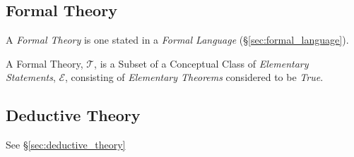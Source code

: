 \subsection{Formal Theory}\label{sec:formal_theory}

A \emph{Formal Theory} is one stated in a \emph{Formal Language}
(\S\ref{sec:formal_language}).

A Formal Theory, $\mathcal{T}$, is a Subset of a Conceptual Class of
\emph{Elementary Statements}, $\mathcal{E}$, consisting of
\emph{Elementary Theorems} considered to be \emph{True}.



\subsection{Deductive Theory}

See \S\ref{sec:deductive_theory}

